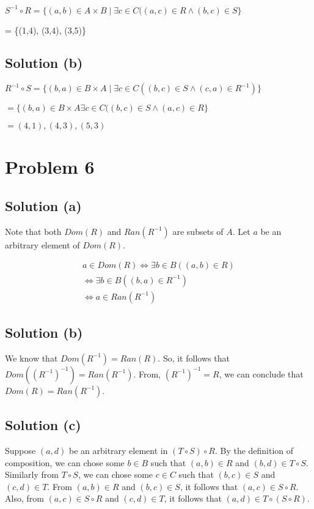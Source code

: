 \documentclass{article}
\begin{document}
$S^{-1} \circ R = \{(a,b) \in A \times B \mid \exists c \in C((a,c)
\in R \land (b,c) \in S\}$

= \{(1,4), (3,4), (3,5)\}

\subsection{Solution (b)}
\noindent
$R^{-1} \circ S = \{(b,a) \in B \times A \mid \exists c \in C((b,c)
\in S \land (c,a) \in R^{-1})\}$

$= \{(b,a) \in B \times A \exists c \in C((b,c) \in S \land (a,c) \in R\}$

$={(4,1),(4,3),(5,3)}$

\section{Problem 6}

\subsection{Solution (a)}

Note that both $Dom(R)$ and $Ran(R^{-1})$ are subsets of $A$. Let $a$
be an arbitrary element of $Dom(R)$.

\begin{align*}
  a \in Dom (R) \iff \exists b \in B ((a,b) \in R) \\
  \iff \exists b \in B((b,a) \in R^{-1}) \\
  \iff a \in Ran(R^{-1})
\end{align*}

\subsection{Solution (b)}

We know that $Dom(R^{-1}) = Ran(R)$. So, it follows that
$Dom((R^{-1})^{-1}) = Ran (R^{-1})$. From, $(R^{-1})^{-1} = R$, we can
conclude that $Dom (R) = Ran (R^{-1})$.

\subsection{Solution (c)}

Suppose $(a,d)$ be an arbitrary element in $(T \circ S) \circ R$. By
the definition of composition, we can chose some $b \in B$ such that
$(a,b) \in R$ and $(b,d) \in T \circ S$. Similarly from $T \circ S$,
we can chose some $c \in C$ such that $(b,c) \in S$ and $(c,d) \in T$.
From $(a,b) \in R$ and $(b,c) \in S$, it follows that $(a,c) \in S
\circ R$. Also, from $(a,c) \in S \circ R$ and $(c,d) \in T$, it
follows that $(a,d) \in T \circ (S \circ R)$.
\end{document}
